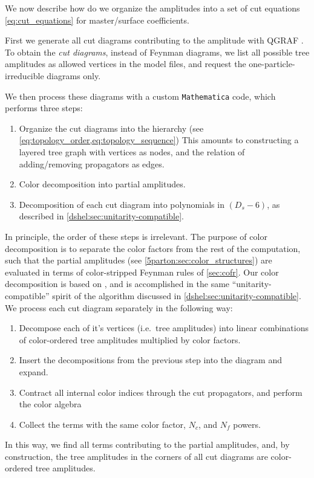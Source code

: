 We now describe how do we organize the amplitudes into a set of cut equations \cref{eq:cut_equations} for master/surface coefficients.

First we generate all cut diagrams contributing to the amplitude with \textsc{QGRAF} \cite{Nogueira:1991ex}.
To obtain the \emph{cut diagrams}, instead of Feynman diagrams,
we list all possible tree amplitudes as allowed vertices in the model files,
and request the one-particle-irreducible diagrams only.

We then process these diagrams with a custom  \texttt{Mathematica} code, which performs three steps:
\begin{enumerate}
  \item Organize the cut diagrams into the hierarchy (see \cref{eq:topology_order,eq:topology_sequence}) 
    This amounts to constructing a layered tree graph with vertices as nodes,
    and the relation of adding/removing propagators as edges.
  \item Color decomposition into partial amplitudes.
  \item Decomposition of each cut diagram into polynomials in $(D_s-6)$, as described in \cref{dshel:sec:unitarity-compatible}.
\end{enumerate}
In principle, the order of these steps is irrelevant.
The purpose of color decomposition is to separate the color factors from the rest of the computation, 
such that  the partial amplitudes (see \cref{5parton:sec:color_structures}) are evaluated in terms of color-stripped Feynman rules of \cref{sec:cofr}.
Our color decomposition is based on \cite{Ochirov:2016ewn,Ochirov:2019mtf},
and is accomplished in the same ``unitarity-compatible'' spirit of the algorithm discussed in \cref{dshel:sec:unitarity-compatible}.
We process each cut diagram separately in the following way:
\begin{enumerate}
  \item Decompose each of it's vertices (i.e.\ tree amplitudes) into linear combinations of color-ordered tree amplitudes multiplied by color factors.
  \item Insert the decompositions from the previous step into the diagram and expand.
  \item Contract all internal color indices through the cut propagators, and perform the color algebra
  \item Collect the terms with the same color factor, $N_c$, and $N_ f$ powers. 
\end{enumerate}
In this way, we find all terms contributing to the partial amplitudes,
and, by construction, the tree amplitudes in the corners of all cut diagrams are color-ordered tree amplitudes.


